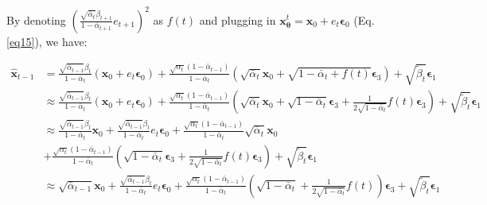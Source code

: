 \documentclass{article} \usepackage{iclr2024_conference,times}
\begin{document}
\noindent
By denoting $(\frac{\sqrt{\bar{\alpha}_t} \beta_{t+1}}{1-\bar{\alpha}_{t+1}} e_{t+1})^2$ as $f(t)$ and plugging in $\pmb{x}^{t}_{\pmb{\theta}} = \pmb{x}_{0} + e_{t}\pmb{\epsilon}_0$ (Eq. \ref{eq15}), we have:

\begin{align}
\hat{\pmb{x}}_{t-1} &= \frac{\sqrt{\bar{\alpha}_{t-1}} \beta_{t}}{1-\bar{\alpha}_{t}} (\pmb{x}_{0} + e_{t}\pmb{\epsilon}_0) + \frac{\sqrt{\alpha_{t}}(1-\bar{\alpha}_{t-1})}{1-\bar{\alpha}_{t}} (\sqrt{\bar{\alpha}_t} \pmb{x}_0 + \sqrt{1-\bar{\alpha}_t + f(t) } \pmb{\epsilon}_3) + \sqrt{ \tilde{\beta}_{t}} \pmb{\epsilon}_1 \label{eq52} \\
& \approx \frac{\sqrt{\bar{\alpha}_{t-1}} \beta_{t}}{1-\bar{\alpha}_{t}} (\pmb{x}_{0} + e_{t}\pmb{\epsilon}_0) + \frac{\sqrt{\alpha_{t}}(1-\bar{\alpha}_{t-1})}{1-\bar{\alpha}_{t}} (\sqrt{\bar{\alpha}_t} \pmb{x}_0 + \sqrt{1-\bar{\alpha}_t} \pmb{\epsilon}_3 + \frac{1}{2\sqrt{1-\bar{\alpha}_t}} f(t)\pmb{\epsilon}_3) + \sqrt{ \tilde{\beta}_{t}} \pmb{\epsilon}_1 \label{eq53} \\
& \approx \frac{\sqrt{\bar{\alpha}_{t-1}} \beta_{t}}{1-\bar{\alpha}_{t}} \pmb{x}_{0} +  \frac{\sqrt{\bar{\alpha}_{t-1}} \beta_{t}}{1-\bar{\alpha}_{t}} e_{t}\pmb{\epsilon}_0 + \frac{\sqrt{\alpha_{t}}(1-\bar{\alpha}_{t-1})}{1-\bar{\alpha}_{t}} \sqrt{\bar{\alpha}_t} \pmb{x}_0 \nonumber \\
& + \frac{\sqrt{\alpha_{t}}(1-\bar{\alpha}_{t-1})}{1-\bar{\alpha}_{t}} (\sqrt{1-\bar{\alpha}_t} \pmb{\epsilon}_3 + \frac{1}{2\sqrt{1-\bar{\alpha}_t}} f(t)\pmb{\epsilon}_3) + \sqrt{ \tilde{\beta}_{t}} \pmb{\epsilon}_1 \label{eq54} \\
& \approx \sqrt{\bar{\alpha}_{t-1}} \pmb{x}_{0} +  \frac{\sqrt{\bar{\alpha}_{t-1}} \beta_{t}}{1-\bar{\alpha}_{t}} e_{t}\pmb{\epsilon}_0 + \frac{\sqrt{\alpha_{t}}(1-\bar{\alpha}_{t-1})}{1-\bar{\alpha}_{t}} (\sqrt{1-\bar{\alpha}_t} 
+ \frac{1}{2\sqrt{1-\bar{\alpha}_t}} f(t))\pmb{\epsilon}_3 + \sqrt{ \tilde{\beta}_{t}} \pmb{\epsilon}_1 \label{eq55} \\
\nonumber
\end{align}
\end{document}
